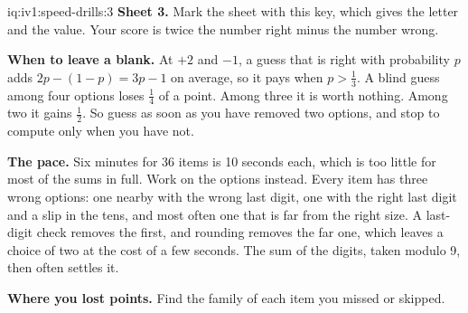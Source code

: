 \begin{solution}{iq:iv1:speed-drills:3}
\textbf{Sheet 3.} Mark the sheet with this key, which gives the letter and the value. Your score is twice the number right minus the number wrong.
\par\nopagebreak


\textbf{When to leave a blank.} At $+2$ and $-1$, a guess that is right with probability $p$ adds $2p - (1 - p) = 3p - 1$ on average, so it pays when $p > \tfrac13$. A blind guess among four options loses $\tfrac14$ of a point. Among three it is worth nothing. Among two it gains $\tfrac12$. So guess as soon as you have removed two options, and stop to compute only when you have not.

\textbf{The pace.} Six minutes for 36 items is 10 seconds each, which is too little for most of the sums in full. Work on the options instead. Every item has three wrong options: one nearby with the wrong last digit, one with the right last digit and a slip in the tens, and most often one that is far from the right size. A last-digit check removes the first, and rounding removes the far one, which leaves a choice of two at the cost of a few seconds. The sum of the digits, taken modulo 9, then often settles it.

\textbf{Where you lost points.} Find the family of each item you missed or skipped.


\end{solution}

